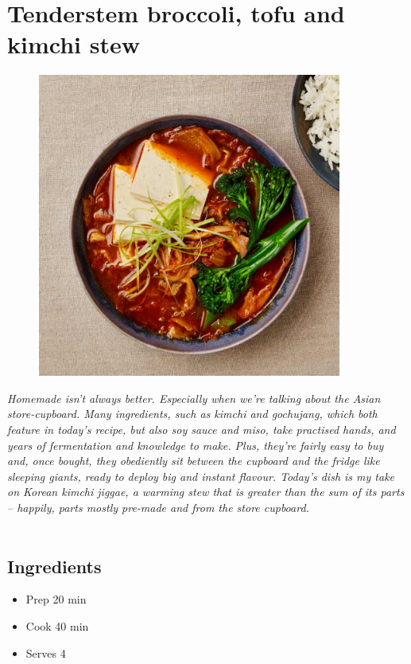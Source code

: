 \documentclass{book}
\begin{document}
\section{Tenderstem broccoli, tofu and kimchi stew}
\begin{figure}
\centering\includegraphics[width=10cm,height=10cm,keepaspectratio]{Recipe_Pictures/Tenderstem_broccoli,_tofu_and_kimchi_stew.png}
\end{figure}
\emph{Homemade isn’t always better. Especially when we’re talking about the Asian store-cupboard. Many ingredients, such as kimchi and gochujang, which both feature in today’s recipe, but also soy sauce and miso, take practised hands, and years of fermentation and knowledge to make. Plus, they’re fairly easy to buy and, once bought, they obediently sit between the cupboard and the fridge like sleeping giants, ready to deploy big and instant flavour. Today’s dish is my take on Korean kimchi jiggae, a warming stew that is greater than the sum of its parts – happily, parts mostly pre-made and from the store cupboard.}\\\\ 
\subsection*{Ingredients}
\begin{itemize}
\item Prep 20 min
\item Cook 40 min
\item Serves 4
\end{itemize}
\end{document}
